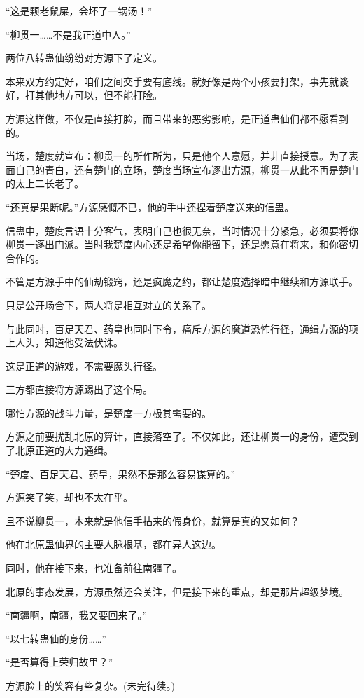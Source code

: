 \begin{this_body}
“这是颗老鼠屎，会坏了一锅汤！”

“柳贯一……不是我正道中人。”

两位八转蛊仙纷纷对方源下了定义。

本来双方约定好，咱们之间交手要有底线。就好像是两个小孩要打架，事先就谈好，打其他地方可以，但不能打脸。

方源这样做，不仅是直接打脸，而且带来的恶劣影响，是正道蛊仙们都不愿看到的。

当场，楚度就宣布：柳贯一的所作所为，只是他个人意愿，并非直接授意。为了表面自己的青白，还有楚门的立场，楚度当场宣布逐出方源，柳贯一从此不再是楚门的太上二长老了。

“还真是果断呢。”方源感慨不已，他的手中还捏着楚度送来的信蛊。

信蛊中，楚度言语十分客气，表明自己也很无奈，当时情况十分紧急，必须要将你柳贯一逐出门派。当时我楚度内心还是希望你能留下，还是愿意在将来，和你密切合作的。

不管是方源手中的仙劫锻窍，还是疯魔之约，都让楚度选择暗中继续和方源联手。

只是公开场合下，两人将是相互对立的关系了。

与此同时，百足天君、药皇也同时下令，痛斥方源的魔道恐怖行径，通缉方源的项上人头，知道他受法伏诛。

这是正道的游戏，不需要魔头行径。

三方都直接将方源踢出了这个局。

哪怕方源的战斗力量，是楚度一方极其需要的。

方源之前要扰乱北原的算计，直接落空了。不仅如此，还让柳贯一的身份，遭受到了北原正道的大力通缉。

“楚度、百足天君、药皇，果然不是那么容易谋算的。”

方源笑了笑，却也不太在乎。

且不说柳贯一，本来就是他信手拈来的假身份，就算是真的又如何？

他在北原蛊仙界的主要人脉根基，都在异人这边。

同时，他在接下来，也准备前往南疆了。

北原的事态发展，方源虽然还会关注，但是接下来的重点，却是那片超级梦境。

“南疆啊，南疆，我又要回来了。”

“以七转蛊仙的身份……”

“是否算得上荣归故里？”

方源脸上的笑容有些复杂。(未完待续。)

\end{this_body}

